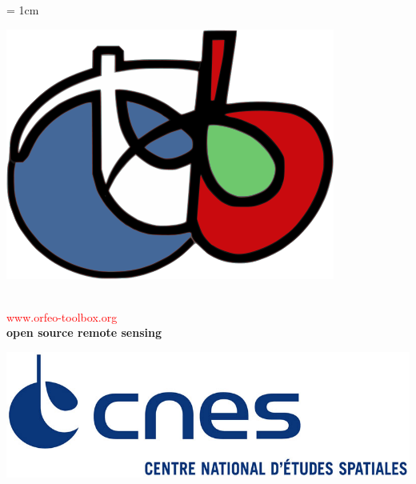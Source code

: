 \documentclass[portrait,a0]{a0poster}
\newenvironment{poster}{
  \begin{center}
  \begin{minipage}[c]{0.99\textwidth}
}{
  \end{minipage} 
  \end{center}
}
\begin{document}
\unitlength = 1cm
\vspace*{1.5cm}
\begin{poster}
  
\begin{minipage}[l]{0.15\textwidth}
	\begin{flushleft}
 		\includegraphics[width=0.7\columnwidth]{Pictures/logoVectoriel.png}\\	
	\end{flushleft}
\end{minipage}
\hfill
\begin{minipage}[c]{0.69\textwidth}
\begin{center}
\\
\vspace{0.5cm}
\huge{\textcolor{red}{www.orfeo-toolbox.org}}\\
\vspace{0.7cm}
\Huge{\textbf{\sc open source remote sensing}}
\vspace{0.7cm}
\end{center}
\end{minipage}
\hfill 
\begin{minipage}[r]{0.15\textwidth}
	\begin{center}
		\vspace{1cm}
		\includegraphics[width=1.0\columnwidth]{Pictures/logo_cnes.jpg}\\		
	\end{center}
\end{minipage}


\end{poster}
\end{document}

